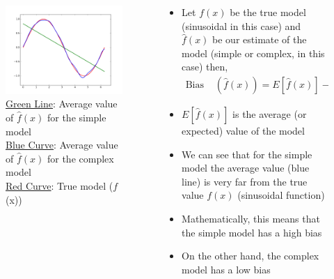 \begin{frame}
	\begin{columns}
		\begin{column}{0.4\textwidth}
			\begin{figure}
				\justifying
				\includegraphics[width=0.9\linewidth]{images/combine}
				\caption{\underline{Green Line}: Average value of $\hat{f}(x)$ for the simple model\\
					\underline{Blue Curve}: Average value of $\hat{f}(x)$ for the complex model\\  
					\underline{Red Curve}: True model ($f$(x))}
				\label{fig:combine}
			\end{figure}
								
							
		\end{column}
					
		\begin{column}{0.6\textwidth}
			\begin{itemize}
				\justifying 						
				\setlength\itemsep{1em}
				\item<1-> Let $f(x)$ be the true model (sinusoidal in this case) and $\hat{f}(x)$ be our estimate of the model (simple or complex, in this case) then,
				\begin{align*}
					\text{Bias } & (\hat{f}(x))=E[\hat{f}(x)]-f(x) &   
				\end{align*}
				\item<2->$E[\hat{f}(x)]$ is the average (or expected) value of the model
									
				\item<3-> We can see that for the simple model the average value (blue line) is very far from the true value $f(x)$ (sinusoidal function)
				\item<4-> Mathematically, this means that the simple model has a high bias
				\item<5-> On the other hand, the complex model has a low bias
			\end{itemize}
		\end{column}
	\end{columns}
\end{frame}
